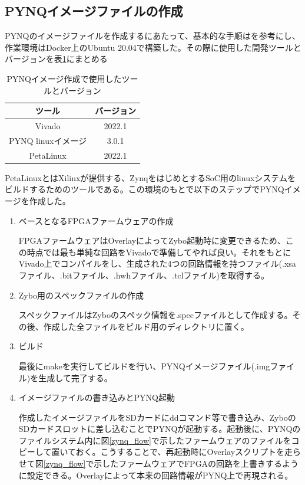 \subsection{PYNQイメージファイルの作成}

PYNQのイメージファイルを作成するにあたって、基本的な手順は\cite{image}を参考にし、作業環境はDocker上のUbuntu 20.04で構築した。その際に使用した開発ツールとバージョンを表\ref{PYNQ_table}にまとめる

\begin{table}[htbp]
  \centering
  \caption{PYNQイメージ作成で使用したツールとバージョン}
  \vspace{3mm}
  \begin{tabular}{cc} \hline\hline
    ツール & バージョン \\ \hline
    Vivado & 2022.1\\
    PYNQ linuxイメージ & 3.0.1\\
    PetaLinux & 2022.1\\ \hline\hline
  \end{tabular}
  \label{PYNQ_table}
\end{table}

PetaLinuxとはXilinxが提供する、ZynqをはじめとするSoC用のlinuxシステムをビルドするためのツールである。この環境のもとで以下のステップでPYNQイメージを作成した。
\begin{enumerate}
  \item ベースとなるFPGAファームウェアの作成

  FPGAファームウェアはOverlayによってZybo起動時に変更できるため、この時点では最も単純な回路をVivadoで準備してやれば良い。それをもとにVivado上でコンパイルをし、生成された4つの回路情報を持つファイル(.xsaファイル、.bitファイル、.hwhファイル、.tclファイル)を取得する。
  \item Zybo用のスペックファイルの作成

  スペックファイルはZyboのスペック情報を.specファイルとして作成する。その後、作成した全ファイルをビルド用のディレクトリに置く。
  \item ビルド

  最後にmakeを実行してビルドを行い、PYNQイメージファイル(.imgファイル)を生成して完了する。
  \item イメージファイルの書き込みとPYNQ起動

  作成したイメージファイルをSDカードにddコマンド等で書き込み、ZyboのSDカードスロットに差し込むことでPYNQが起動する。起動後に、PYNQのファイルシステム内に図\ref{zynq_flow}で示したファームウェアのファイルをコピーして置いておく。こうすることで、再起動時にOverlayスクリプトを走らせて図\ref{zynq_flow}で示したファームウェアでFPGAの回路を上書きするように設定できる。Overlayによって本来の回路情報がPYNQ上で再現される。

\end{enumerate}

